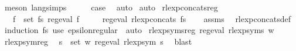 \begin{isabellebody}
\ {\isacharparenleft}{\kern0pt}meson\ lang{\isachardot}{\kern0pt}simps{\isacharparenleft}{\kern0pt}{}{\isacharparenright}{\kern0pt}{\isacharparenright}{\kern0pt}\isanewline
\ \ \isamarkupfalse%
\ \isamarkupfalse%
\ {\isacharquery}{\kern0pt}case\ \isamarkupfalse%
\ auto\isanewline
{}\isamarkupfalse%
\ auto%
\endisatagproof
{\isafoldproof}%
%
\isadelimproof
\isanewline
%
\endisadelimproof
\isanewline
{}\isamarkupfalse%
\ rlexp{\isacharunderscore}{\kern0pt}concats{\isacharunderscore}{\kern0pt}reg{\isacharcolon}{\kern0pt}\isanewline
\ \ \ {\isachardoublequoteopen}{\isasymforall}f\ {\isasymin}\ set\ fs{\isachardot}{\kern0pt}\ reg{\isacharunderscore}{\kern0pt}eval\ f{\isachardoublequoteclose}\isanewline
\ \ \ \ \ {\isachardoublequoteopen}reg{\isacharunderscore}{\kern0pt}eval\ {\isacharparenleft}{\kern0pt}rlexp{\isacharunderscore}{\kern0pt}concats\ fs{\isacharparenright}{\kern0pt}{\isachardoublequoteclose}\isanewline
%
\isadelimproof
\ \ %
\endisadelimproof
%
\isatagproof
{}\isamarkupfalse%
\ assms\ \isamarkupfalse%
\ rlexp{\isacharunderscore}{\kern0pt}concats{\isacharunderscore}{\kern0pt}def\ \isamarkupfalse%
\ {\isacharparenleft}{\kern0pt}induction\ fs{\isacharparenright}{\kern0pt}\ {\isacharparenleft}{\kern0pt}use\ epsilon{\isacharunderscore}{\kern0pt}regular\ \ auto{\isacharparenright}{\kern0pt}%
\endisatagproof
{\isafoldproof}%
%
\isadelimproof
\isanewline
%
\endisadelimproof
\isanewline
{}\isamarkupfalse%
\ rlexp{\isacharunderscore}{\kern0pt}syms{\isacharunderscore}{\kern0pt}reg{\isacharcolon}{\kern0pt}\ {\isachardoublequoteopen}reg{\isacharunderscore}{\kern0pt}eval\ {\isacharparenleft}{\kern0pt}rlexp{\isacharunderscore}{\kern0pt}syms\ w{\isacharparenright}{\kern0pt}{\isachardoublequoteclose}\isanewline
%
\isadelimproof
%
\endisadelimproof
%
\isatagproof
{}\isamarkupfalse%
\ {\isacharminus}{\kern0pt}\isanewline
\ \ \isamarkupfalse%
\ rlexp{\isacharunderscore}{\kern0pt}sym{\isacharunderscore}{\kern0pt}reg\ \isamarkupfalse%
\ {\isachardoublequoteopen}{\isasymforall}s\ {\isasymin}\ set\ w{\isachardot}{\kern0pt}\ reg{\isacharunderscore}{\kern0pt}eval\ {\isacharparenleft}{\kern0pt}rlexp{\isacharunderscore}{\kern0pt}sym\ s{\isacharparenright}{\kern0pt}{\isachardoublequoteclose}\ \isamarkupfalse%
\ blast\isanewline
\ \ \isamarkupfalse%

\end{isabellebody}
